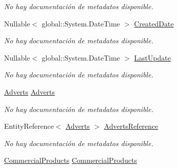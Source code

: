 \begin{DoxyCompactItemize}
\begin{DoxyCompactList}\small\item\em No hay documentación de metadatos disponible. \end{DoxyCompactList}\item 
Nullable$<$ global\-::\-System.\-Date\-Time $>$ \hyperlink{class_microsoft_1_1_samples_1_1_kinect_1_1_basic_interactions_1_1_game_details_aec5394110b7c86d9127ea34a12d19901}{Created\-Date}
\begin{DoxyCompactList}\small\item\em No hay documentación de metadatos disponible. \end{DoxyCompactList}\item 
Nullable$<$ global\-::\-System.\-Date\-Time $>$ \hyperlink{class_microsoft_1_1_samples_1_1_kinect_1_1_basic_interactions_1_1_game_details_a4d984899a56fbee62959435eefb21b83}{Last\-Update}
\begin{DoxyCompactList}\small\item\em No hay documentación de metadatos disponible. \end{DoxyCompactList}\item 
\hyperlink{class_microsoft_1_1_samples_1_1_kinect_1_1_basic_interactions_1_1_adverts}{Adverts} \hyperlink{class_microsoft_1_1_samples_1_1_kinect_1_1_basic_interactions_1_1_game_details_a138e3476c874bbad172268cf13178790}{Adverts}
\begin{DoxyCompactList}\small\item\em No hay documentación de metadatos disponible. \end{DoxyCompactList}\item 
Entity\-Reference$<$ \hyperlink{class_microsoft_1_1_samples_1_1_kinect_1_1_basic_interactions_1_1_adverts}{Adverts} $>$ \hyperlink{class_microsoft_1_1_samples_1_1_kinect_1_1_basic_interactions_1_1_game_details_a6532c0a9fe87d65eaccfccf405f7d813}{Adverts\-Reference}
\begin{DoxyCompactList}\small\item\em No hay documentación de metadatos disponible. \end{DoxyCompactList}\item 
\hyperlink{class_microsoft_1_1_samples_1_1_kinect_1_1_basic_interactions_1_1_commercial_products}{Commercial\-Products} \hyperlink{class_microsoft_1_1_samples_1_1_kinect_1_1_basic_interactions_1_1_game_details_ac2d3163862d779ae74e3c416246ef66b}{Commercial\-Products}

\end{DoxyCompactItemize}
